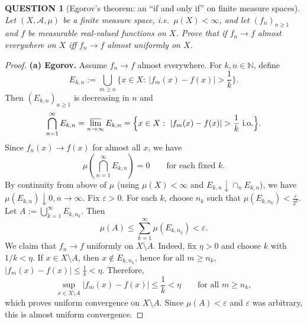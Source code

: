 \documentclass[12pt]{article}
\renewcommand{\(}{\left(}%
\renewcommand{\)}{\right)}%
\renewcommand{\[}{\left[}%
\renewcommand{\]}{\right]}%
\newtheorem{question}{QUESTION}[section]}
\newtheorem{proof}{Proof.}}
\begin{document}
\begin{question}[Egorov's theorem: an ``if and only if'' on finite measure spaces]
Let $(X,\mathcal A,\mu)$ be a \emph{finite} measure space, i.e.\ $\mu(X)<\infty$, and let
$(f_n)_{n\ge1}$ and $f$ be measurable real-valued functions on $X$. Prove that if $f_n\to f$ almost everywhere on $X$ iff $f_n\to f$ almost uniformly on $X$.
\end{question}

\begin{proof}
\textbf{(a) Egorov.}
Assume $f_n\to f$ almost everywhere. For $k,n\in\mathbb N$, define
\begin{equation*}
E_{k,n}:=\bigcup_{m\ge n}\Big\{x\in X:\ |f_m(x)-f(x)|>\frac{1}{k}\Big\}.
\end{equation*}
Then $(E_{k,n})_{n\ge1}$ is decreasing in $n$ and
\begin{equation*}
\bigcap_{n=1}^\infty E_{k,n}
=\varlimsup_{n\to\infty}E_{k,n}=
\Big\{x\in X:\ |f_m(x)-f(x)|>\frac{1}{k}\ \text{i.o.}\Big\}.
\end{equation*}
Since $f_n(x)\to f(x)$ for almost all $x$, we have
\begin{equation*}
\mu\!\left(\bigcap_{n=1}^\infty E_{k,n}\right)=0
\qquad\text{for each fixed } k.
\end{equation*}
By continuity from above of $\mu$ (using $\mu(X)<\infty$ and $E_{k,n}\downarrow \cap_n E_{k,n}$), we have $\mu(E_{k,n})\downarrow 0,n\to\infty$.
Fix $\varepsilon>0$. For each $k$, choose $n_k$ such that $\mu(E_{k,n_k})<\frac{\varepsilon}{2^k}$.
Let $A:=\bigcup_{k=1}^\infty E_{k,n_k}.$
Then
\begin{equation*}
\mu(A)\le \sum_{k=1}^\infty \mu(E_{k,n_k})<\varepsilon.
\end{equation*}
We claim that $f_n\to f$ uniformly on $X\setminus A$. Indeed, fix $\eta>0$ and choose $k$ with
$1/k<\eta$. If $x\in X\setminus A$, then $x\notin E_{k,n_k}$, hence for all $m\ge n_k$, $|f_m(x)-f(x)|\le \frac{1}{k}<\eta.$
Therefore,
\begin{equation*}
\sup_{x\in X\setminus A}|f_m(x)-f(x)|\le \frac{1}{k}<\eta
\qquad \text{for all } m\ge n_k,
\end{equation*}
which proves uniform convergence on $X\setminus A$. Since $\mu(A)<\varepsilon$ and $\varepsilon$ was
arbitrary, this is almost uniform convergence.


\end{proof}
\end{document}
